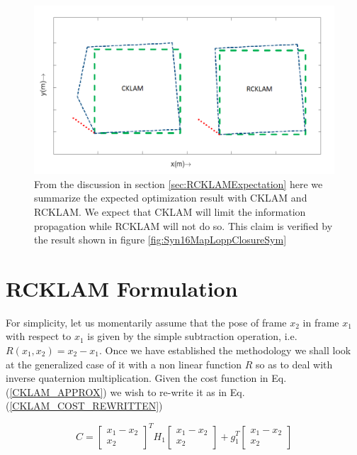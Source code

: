 \begin{figure}
	\centering
		\includegraphics[width=1.00\textwidth]{images/hypotheticalLoopClosureCklamRcklam.png}
  \caption{From the discussion in section \ref{sec:RCKLAMExpectation} here we summarize the expected optimization result with CKLAM and RCKLAM. We expect that CKLAM will limit the information propagation while RCKLAM will not do so. This claim is verified by the result shown in figure \ref{fig:Syn16MapLoppClosureSym}}
  \label{fig:hypotheticalLoopClosureCklamRcklam}
\end{figure}

 

\section{RCKLAM Formulation}
\label{rcklamSimple}
For simplicity, let us momentarily assume that the pose of frame $x_2$ in frame $x_1$ with respect to $x_1$ is given by the simple  subtraction operation, i.e. $R(x_1, x_2) = x_2 - x_1$. Once we have established the methodology we shall look at the generalized case of it with a non linear function $R$ so as to deal with inverse quaternion multiplication. Given the cost function in Eq.(\ref{CKLAM_APPROX}) we wish to re-write it as in Eq.(\ref{CKLAM_COST_REWRITTEN})

\begin{equation}
	C = \begin{bmatrix} x_1-x_2 \\ x_2 \end{bmatrix} ^TH_1\begin{bmatrix} x_1-x_2 \\ x_2 \end{bmatrix} + g_1^T\begin{bmatrix} x_1-x_2 \\ x_2 \end{bmatrix}
	\label{CKLAM_COST_REWRITTEN}
\end{equation}

